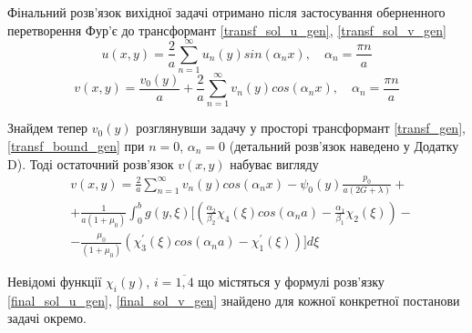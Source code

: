 Фінальний розв'язок вихідної задачі отримано після застосування оберненного перетворення Фур'є до трансформант \eqref{transf_sol_u_gen}, \eqref{transf_sol_v_gen}
\begin{equation}\label{final_sol_u_gen}
    u(x,y) = \frac{2}{a} \sum_{n=1}^{\infty} u_n(y) sin(\alpha_n x), \quad \alpha_n = \frac{\pi n}{a}
\end{equation}
\begin{equation}
    v(x,y) = \frac{v_0(y)}{a} + \frac{2}{a} \sum_{n=1}^{\infty} v_n(y) cos(\alpha_n x), \quad \alpha_n = \frac{\pi n}{a}
\end{equation}

Знайдем тепер $v_0(y)$ розглянувши задачу у просторі трансформант \eqref{transf_gen}, \eqref{transf_bound_gen} при $n=0$, $\alpha_n = 0$
(детальний розв'язок наведено у Додатку D). Тоді остаточний розв'язок $v(x,y)$ набуває вигляду
\begin{align}\label{final_sol_v_gen}
    &v(x,y) = \frac{2}{a} \sum_{n=1}^{\infty} v_n(y) cos(\alpha_n x) - \psi_0(y) \frac{p_0}{a(2G + \lambda)} + \nonumber \\
    &+ \frac{1}{a(1+\mu_0)} \int_{0}^{b}g(y,\xi) [ (\frac{\alpha_2}{\beta_2}\chi_4(\xi) cos(\alpha_n a) - \frac{\alpha_1}{\beta_1}\chi_2(\xi)) - \nonumber \\
    & - \frac{\mu_0}{(1+\mu_0)} (\chi_3^{'}(\xi) cos(\alpha_n a) -\chi_1^{'}(\xi)) ] d\xi
\end{align}

Невідомі функції $\chi_i(y)$, $i=\overline{1, 4}$ що містяться у формулі розв'язку \eqref{final_sol_u_gen}, \eqref{final_sol_v_gen} знайдено для кожної конкретної постанови задачі окремо.

